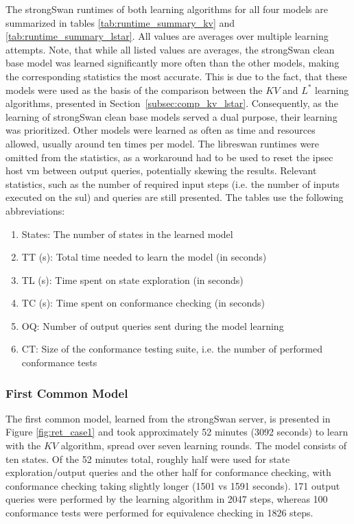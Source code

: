 The strongSwan runtimes of both learning algorithms for all four models are summarized in tables \ref{tab:runtime_summary_kv} and \ref{tab:runtime_summary_lstar}. All values are averages over multiple learning attempts. Note, that while all listed values are averages, the strongSwan clean base model was learned significantly more often than the other models, making the corresponding statistics the most accurate. This is due to the fact, that these models were used as the basis of the comparison between the $KV$ and $L^*$ learning algorithms, presented in Section~\ref{subsec:comp_kv_lstar}. Consequently, as the learning of strongSwan clean base models served a dual purpose, their learning was prioritized. Other models were learned as often as time and resources allowed, usually around ten times per model. The libreswan runtimes were omitted from the statistics, as a workaround had to be used to reset the \ac{ipsec} host \ac{vm} between output queries, potentially skewing the results. Relevant statistics, such as the number of required input steps (i.e. the number of inputs executed on the \ac{sul}) and queries are still presented. The tables use the following abbreviations:

\begin{enumerate}
	\item States: The number of states in the learned model
	\item TT (s): Total time needed to learn the model (in seconds)
	\item TL (s): Time spent on state exploration (in seconds)
	\item TC (s): Time spent on conformance checking (in seconds)
	\item OQ: Number of output queries sent during the model learning
	\item CT: Size of the conformance testing suite, i.e. the number of performed conformance tests
\end{enumerate}
\newpage
 

\subsubsection*{First Common Model}

The first common model, learned from the strongSwan server, is presented in Figure \ref{fig:ret_case1} and took approximately 52 minutes (3092 seconds) to learn with the $KV$ algorithm, spread over seven learning rounds. The model consists of ten states. Of the 52 minutes total, roughly half were used for state exploration/output queries and the other half for conformance checking, with conformance checking taking slightly longer (1501 vs 1591 seconds). 171 output queries were performed by the learning algorithm in 2047 steps, whereas 100 conformance tests were performed for equivalence checking in 1826 steps.

